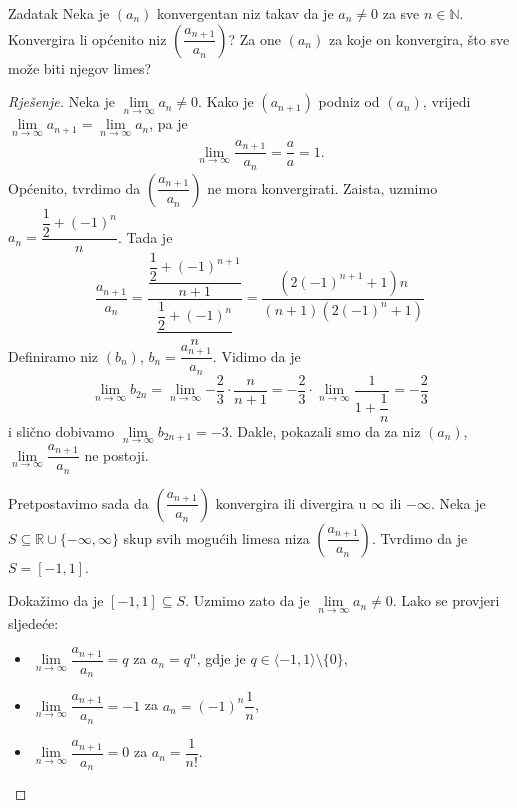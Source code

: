 \begin{exercise}{Zadatak}
\label{setoflimits}
Neka je \((a_n)\) konvergentan niz takav da je \(a_n\neq 0\) za sve \(n\in \mathbb{N}\). Konvergira li općenito niz \(\left(\dfrac{a_{n+1}}{a_n}\right)\)? Za one $(a_n)$ za koje on konvergira, što sve može biti njegov limes?
\end{exercise}
\begin{proof}[Rješenje]
Neka je \(\lim\limits_{n\to \infty}{a_n}\neq 0\). Kako je \((a_{n+1})\) podniz od \((a_n)\), vrijedi \(\lim\limits_{n\to \infty}{a_{n+1}}=\lim\limits_{n\to \infty}{a_{n}}\), pa je
\begin{gather}
\label{34}
\lim\limits_{n\to \infty}{\dfrac{a_{n+1}}{a_n}}=\dfrac{a}{a}=1.
\end{gather}
Općenito, tvrdimo da \(\left(\dfrac{a_{n+1}}{a_n}\right)\) ne mora konvergirati. Zaista, uzmimo \(a_n=\dfrac{\dfrac{1}{2}+(-1)^n}{n}\). Tada je
\[\dfrac{a_{n+1}}{a_n}=\dfrac{\dfrac{\dfrac{1}{2}+(-1)^{n+1}}{n+1}}{\dfrac{\dfrac{1}{2}+(-1)^n}{n}}=\dfrac{\left(2\left(-1\right)^{n+1}+1\right)n}{\left(n+1\right)\left(2\left(-1\right)^n+1\right)}\]
Definiramo niz \((b_n)\), \(b_n=\dfrac{a_{n+1}}{a_n}\). Vidimo da je \[\lim\limits_{n\to \infty}{b_{2n}}=\lim\limits_{n\to \infty}{-\dfrac{2}{3}\cdot \dfrac{n}{n+1}}=-\dfrac{2}{3}\cdot \lim\limits_{n\to \infty}{\dfrac{1}{1+\dfrac{1}{n}}}=-\dfrac{2}{3}\]
i slično dobivamo \(\lim\limits_{n\to \infty}{b_{2n+1}}=-3\). Dakle, pokazali smo da za niz \((a_n)\), \(\lim\limits_{n\to \infty}{\dfrac{a_{n+1}}{a_n}}\) ne postoji.

Pretpostavimo sada da \(\left(\dfrac{a_{n+1}}{a_n}\right)\) konvergira ili divergira u \(\infty\) ili \(-\infty\). Neka je \(S\subseteq \mathbb{R}\cup \{-\infty, \infty\}\) skup svih mogućih limesa niza \(\left(\dfrac{a_{n+1}}{a_n}\right)\). Tvrdimo da je \(S=[-1, 1]\). 

Dokažimo da je \([-1, 1]\subseteq S\). Uzmimo zato da je \(\lim\limits_{n\to \infty}{a_n}\neq 0\). Lako se provjeri sljedeće:
\begin{itemize}
\item \(\lim\limits_{n\to \infty}{\dfrac{a_{n+1}}{a_n}}=q\) za \(a_n=q^n\), gdje je \(q\in \langle -1, 1\rangle\setminus\{0\}\),
\item \(\lim\limits_{n\to \infty}{\dfrac{a_{n+1}}{a_n}}=-1\) za \(a_n=(-1)^n\dfrac{1}{n}\),
\item \(\lim\limits_{n\to \infty}{\dfrac{a_{n+1}}{a_n}}=0\) za \(a_n=\dfrac{1}{n!}\).
\end{itemize}


\end{proof}
